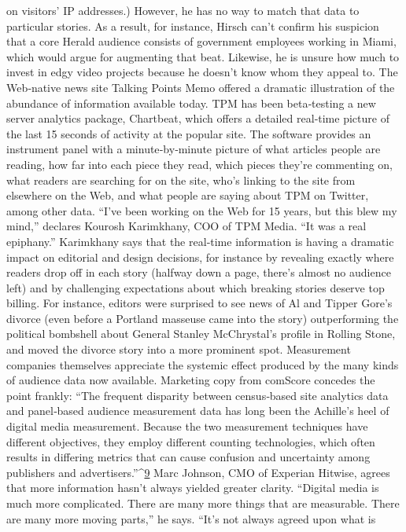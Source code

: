 on visitors’ IP addresses.) However, he has no way to match that data to
particular stories. As a result, for instance, Hirsch can’t confirm his
suspicion that a core Herald audience consists of government employees
working in Miami, which would argue for augmenting that beat.
Likewise, he is unsure how much to invest in edgy video projects because
he doesn’t know whom they appeal to.
The Web‐native news site Talking Points Memo offered a dramatic
illustration of the abundance of information available today. TPM has
been beta‐testing a new server analytics package, Chartbeat, which offers
a detailed real‐time picture of the last 15 seconds of activity at the popular
site. The software provides an instrument panel with a minute‐by‐minute
picture of what articles people are reading, how far into each piece they
read, which pieces they’re commenting on, what readers are searching for
on the site, who’s linking to the site from elsewhere on the Web, and what
people are saying about TPM on Twitter, among other data.
``I’ve been working on the Web for 15 years, but this blew my mind,''
declares Kourosh Karimkhany, COO of TPM Media. ``It was a real
epiphany.'' Karimkhany says that the real‐time information is having a
dramatic impact on editorial and design decisions, for instance by
revealing exactly where readers drop off in each story (halfway down a
page, there’s almost no audience left) and by challenging expectations
about which breaking stories deserve top billing. For instance, editors
were surprised to see news of Al and Tipper Gore’s divorce (even before a
Portland masseuse came into the story) outperforming the political
bombshell about General Stanley McChrystal’s profile in Rolling Stone,
and moved the divorce story into a more prominent spot.
Measurement companies themselves appreciate the systemic effect
produced by the many kinds of audience data now available. Marketing
copy from comScore concedes the point frankly:
``The frequent disparity between census‐based site analytics data
and panel‐based audience measurement data has long been the
Achille’s heel of digital media measurement. Because the two
measurement techniques have different objectives, they employ
different counting technologies, which often results in differing
metrics that can cause confusion and uncertainty among publishers
and advertisers.''^{\href{#endnotes}{9}}
Marc Johnson, CMO of Experian Hitwise, agrees that more information
hasn’t always yielded greater clarity. ``Digital media is much more
complicated. There are many more things that are measurable. There are
many more moving parts,'' he says. ``It’s not always agreed upon what is
